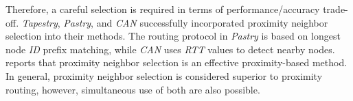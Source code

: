 Therefore, a careful selection is required in terms of
performance/accuracy trade-off. 
\emph{Tapestry}, \emph{Pastry}, and \emph{CAN} successfully incorporated
proximity neighbor selection into their methods. 
The routing protocol in \emph{Pastry} is based on longest node 
\emph{ID} prefix matching, while \emph{CAN} uses \emph{RTT} values to
detect nearby nodes. \cite{CDCR2002a} reports that proximity neighbor
selection is an effective proximity-based method.
In general, proximity neighbor selection is considered 
superior to proximity routing, however, simultaneous use of both
are also possible.

%
%
%
%
%





